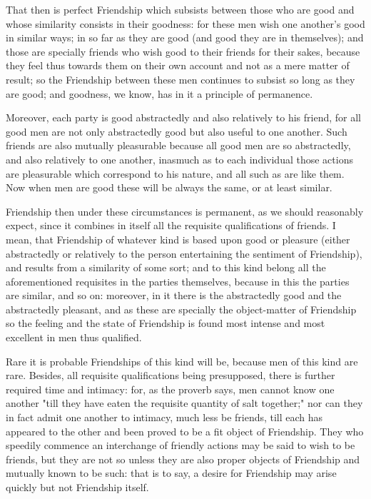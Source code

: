 That then is perfect Friendship which subsists between those who are
good and whose similarity consists in their goodness: for these men wish
one another's good in similar ways; in so far as they are good (and good
they are in themselves); and those are specially friends who wish good
to their friends for their sakes, because they feel thus towards them on
their own account and not as a mere matter of result; so the Friendship
between these men continues to subsist so long as they are good; and
goodness, we know, has in it a principle of permanence.

Moreover, each party is good abstractedly and also relatively to his
friend, for all good men are not only abstractedly good but also useful
to one another. Such friends are also mutually pleasurable because
all good men are so abstractedly, and also relatively to one another,
inasmuch as to each individual those actions are pleasurable which
correspond to his nature, and all such as are like them. Now when men
are good these will be always the same, or at least similar.

Friendship then under these circumstances is permanent, as we should
reasonably expect, since it combines in itself all the requisite
qualifications of friends. I mean, that Friendship of whatever kind is
based upon good or pleasure (either abstractedly or relatively to the
person entertaining the sentiment of Friendship), and results from a
similarity of some sort; and to this kind belong all the aforementioned
requisites in the parties themselves, because in this the parties are
similar, and so on: moreover, in it there is the abstractedly good and
the abstractedly pleasant, and as these are specially the object-matter
of Friendship so the feeling and the state of Friendship is found most
intense and most excellent in men thus qualified.

Rare it is probable Friendships of this kind will be, because men
of this kind are rare. Besides, all requisite qualifications being
presupposed, there is further required time and intimacy: for, as the
proverb says, men cannot know one another "till they have eaten the
requisite quantity of salt together;" nor can they in fact admit one
another to intimacy, much less be friends, till each has appeared to
the other and been proved to be a fit object of Friendship. They who
speedily commence an interchange of friendly actions may be said to wish
to be friends, but they are not so unless they are also proper objects
of Friendship and mutually known to be such: that is to say, a desire
for Friendship may arise quickly but not Friendship itself.


